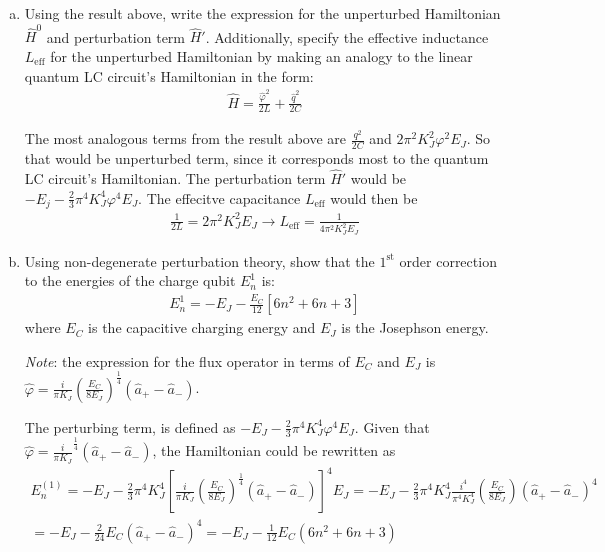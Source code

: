 \documentclass[10pt,letterpaper]{article}
\begin{document}
\begin{enumerate}
\begin{enumerate}[a)]
\item Using the result above, write the expression for the unperturbed Hamiltonian $\hat{H}^{0}$ and perturbation term $\hat{H}'$. Additionally, specify the effective inductance $L_{\text{eff}}$ for the unperturbed Hamiltonian by making an analogy to the linear quantum LC circuit's Hamiltonian in the form:
\begin{gather*}
\hat{H} = \frac{\hat{\varphi}^{2}}{2L} + \frac{\hat{q}^{2}}{2C}
\end{gather*}

\color{violet}
The most analogous terms from the result above are $\frac{q^{2}}{2C}$ and $2\pi^{2}K_{J}^{2}\varphi^{2}E_{J}$. So that would be unperturbed term, since it corresponds most to the quantum LC circuit's Hamiltonian. The perturbation term $\hat{H}'$ would be $-E_{j} - \frac{2}{3}\pi^{4}K_{J}^{4}\varphi^{4}E_{J}$. The effecitve capacitance $L_{\text{eff}}$ would then be
\begin{gather*}
\frac{1}{2L} = 2\pi^{2}K_{J}^{2}E_{J} \rightarrow L_{\text{eff}} = \frac{1}{4\pi^{2}K_{J}^{2}E_{J}}
\end{gather*}
\color{black}

\item Using non-degenerate perturbation theory, show that the $1^{\text{st}}$ order correction to the energies of the charge qubit $E_{n}^{1}$ is:
\begin{gather*}
E_{n}^{1} = -E_{J} - \frac{E_{C}}{12}[6n^{2} + 6n + 3]
\end{gather*}
where $E_{C}$ is the capacitive charging energy and $E_{J}$ is the Josephson energy.

\textit{Note}: the expression for the flux operator in terms of $E_{C}$ and $E_{J}$ is $\hat{\varphi} = \frac{i}{\pi K_{J}}\left( \frac{E_{C}}{8E_{J}} \right)^{\frac{1}{4}}(\hat{a}_{+} - \hat{a}_{-})$. 

\color{violet}
The perturbing term, is defined as $-E_{J} - \frac{2}{3}\pi^{4}K_{J}^{4}\varphi^{4}E_{J}$. Given that $\hat{\varphi} = \frac{i}{\pi K_{J}}^{\frac{1}{4}}(\hat{a}_{+} - \hat{a}_{-})$, the Hamiltonian could be rewritten as
\begin{gather*}
E_{n}^{(1)} = -E_{J} - \frac{2}{3}\pi^{4}K_{J}^{4}\left[ \frac{i}{\pi K_{J}} \left( \frac{E_{C}}{8E_{J}} \right)^{\frac{1}{4}}(\hat{a}_{+} - \hat{a}_{-}) \right]^{4} E_{J} = -E_{J} - \frac{2}{3}\pi^{4}K_{J}^{4} \frac{i^{4}}{\pi^{4}K_{J}^{4}} \left( \frac{E_{C}}{8E_{J}} \right) (\hat{a}_{+} - \hat{a}_{-})^{4} \\
= -E_{J} - \frac{2}{24} E_{C} (\hat{a}_{+} - \hat{a}_{-})^{4} = -E_{J} - \frac{1}{12} E_{C}(6n^{2} + 6n + 3)
\end{gather*}
\color{black}


\end{enumerate}
\end{enumerate}
\end{document}
